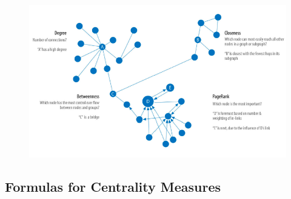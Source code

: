 \begin{figure}[H]
    \centering
    \includegraphics[width=0.75\linewidth]{centrality algorithms.png}

\end{figure}

\subsection{Formulas for Centrality Measures}
